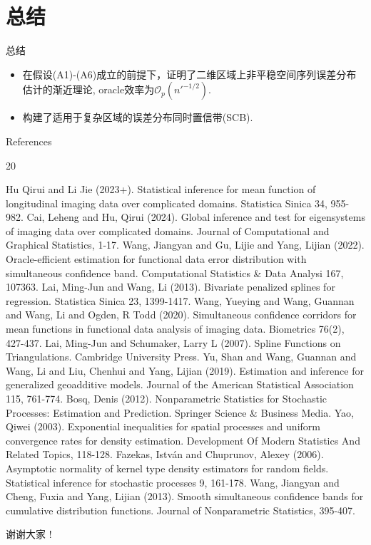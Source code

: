 \documentclass{beamer}
\begin{document}
\section{总结}
\begin{frame}{总结}
\begin{itemize}
    \item 在假设(A1)-(A6)成立的前提下，证明了二维区域上非平稳空间序列误差分布估计的渐近理论, oracle效率为${\scriptstyle{\mathcal{O}}}_{p}\left(n'^{-1/2}\right)$.
    \item 构建了适用于复杂区域的误差分布同时置信带(SCB).
\end{itemize}
\end{frame}


\begin{frame}[allowframebreaks]{References}
\tiny
\begin{thebibliography}{20}

Hu Qirui and Li Jie (2023+). Statistical inference for mean function of longitudinal imaging data over complicated domains. Statistica Sinica 34, 955-982.
Cai, Leheng and Hu, Qirui (2024). Global inference and test for eigensystems of imaging data over complicated domains. Journal of Computational and Graphical Statistics, 1-17.
Wang, Jiangyan and Gu, Lijie and Yang, Lijian (2022). Oracle-efficient estimation for functional data error distribution with simultaneous confidence band. Computational Statistics \& Data Analysi 167, 107363.
Lai, Ming-Jun and Wang, Li (2013). Bivariate penalized splines for regression. Statistica Sinica 23, 1399-1417.
Wang, Yueying and Wang, Guannan and Wang, Li and Ogden, R Todd (2020). Simultaneous confidence corridors for mean functions in functional data analysis of imaging data. Biometrics 76(2), 427-437.
Lai, Ming-Jun and Schumaker, Larry L (2007). Spline Functions on Triangulations. Cambridge University Press.
Yu, Shan and Wang, Guannan and Wang, Li and Liu, Chenhui and Yang, Lijian (2019). Estimation and inference for generalized geoadditive models. Journal of the American Statistical Association 115, 761-774.
Bosq, Denis (2012). Nonparametric Statistics for Stochastic Processes: Estimation and Prediction. Springer Science \& Business Media.
Yao, Qiwei (2003). Exponential inequalities for spatial processes and uniform convergence rates for density estimation. Development Of Modern Statistics And Related Topics, 118-128.
Fazekas, Istv{\'a}n and Chuprunov, Alexey (2006). Asymptotic normality of kernel type density estimators for random fields. Statistical inference for stochastic processes 9, 161-178.
Wang, Jiangyan and Cheng, Fuxia and Yang, Lijian (2013). Smooth simultaneous confidence bands for cumulative distribution functions. Journal of Nonparametric Statistics, 395-407.
\end{thebibliography}
\end{frame}

\begin{frame}
\begin{center}
\Huge{ 谢谢大家 !}
\end{center}
\end{frame}
\end{document}
